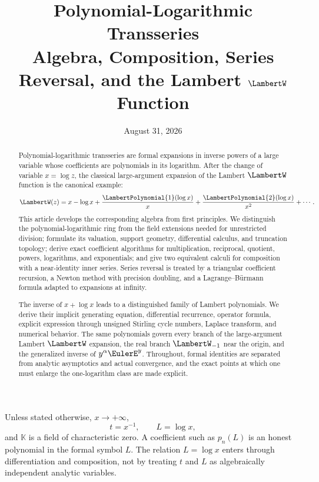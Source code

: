 \documentclass[11pt]{article}
\title{\textbf{Polynomial-Logarithmic Transseries}\\[0.3em]
\Large Algebra, Composition, Series Reversal, and the Lambert \(\LambertW\) Function}
\author{}
\date{August 31, 2026}
\theoremstyle{pltheorem}
\newcommand{\K}{\mathbb K}
\begin{document}
\maketitle
\vspace{-2.0em}

\begin{abstract}
Polynomial-logarithmic transseries are formal expansions in inverse powers of a large variable whose coefficients are polynomials in its logarithm.  After the change of variable
\(x=\log z\), the classical large-argument expansion of the Lambert \(\LambertW\) function is the canonical example:
\[
 \LambertW(z)=x-\log x+\frac{\LambertPolynomial{1}(\log x)}{x}
      +\frac{\LambertPolynomial{2}(\log x)}{x^2}+\cdots .
\]
This article develops the corresponding algebra from first principles.  We distinguish the polynomial-logarithmic ring from the field extensions needed for unrestricted division; formulate its valuation, support geometry, differential calculus, and truncation topology; derive exact coefficient algorithms for multiplication, reciprocal, quotient, powers, logarithms, and exponentials; and give two equivalent calculi for composition with a near-identity inner series.  Series reversal is treated by a triangular coefficient recursion, a Newton method with precision doubling, and a Lagrange--B\"urmann formula adapted to expansions at infinity.

The inverse of \(x+\log x\) leads to a distinguished family of Lambert polynomials.  We derive their implicit generating equation, differential recurrence, operator formula, explicit expression through unsigned Stirling cycle numbers, Laplace transform, and numerical behavior.  The same polynomials govern every branch of the large-argument Lambert \(\LambertW\) expansion, the real branch \(\LambertW_{-1}\) near the origin, and the generalized inverse of \(y^\alpha\EulerE^y\).  Throughout, formal identities are separated from analytic asymptotics and actual convergence, and the exact points at which one must enlarge the one-logarithm class are made explicit.
\end{abstract}

\begin{keybox}
Unless stated otherwise, \(x\to+\infty\),
\[
 t=x^{-1},\qquad L=\log x,
\]
and \(\K\) is a field of characteristic zero.  A coefficient such as \(p_n(L)\) is an honest polynomial in the formal symbol \(L\).  The relation \(L=\log x\) enters through differentiation and composition, not by treating \(t\) and \(L\) as algebraically independent analytic variables.
\end{keybox}
\end{document}
